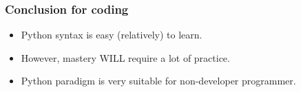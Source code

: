 \begin{frame}[fragile]
\frametitle{Conclusion for coding}
\begin{itemize}
\item Python syntax is easy (relatively) to learn.
\item However, mastery WILL require a lot of practice.
\item Python paradigm is very suitable for non-developer programmer.
\end{itemize}

\end{frame}